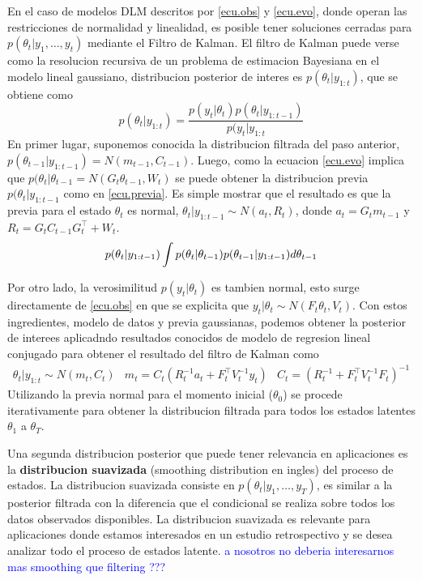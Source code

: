 \documentclass[12pt]{article}\usepackage[]{graphicx}\usepackage[]{color}
\begin{document}
En el caso de modelos DLM descritos por \eqref{ecu.obs} y \eqref{ecu.evo}, donde operan las restricciones de normalidad y linealidad, es posible tener soluciones cerradas para $p(\theta_t | y_1, \ldots, y_t)$ mediante el Filtro de Kalman. El filtro de Kalman puede verse como la resolucion recursiva de un problema de estimacion Bayesiana en el modelo lineal gaussiano, distribucion posterior de interes es $p(\theta_t | y_{1:t} )$, que se obtiene como
\[
p(\theta_t | y_{1:t}) = \frac{ p(y_t | \theta_t) p(\theta_{t} | y_{1:t-1})}{ p(y_t | y_{1:t}  }
\]
En primer lugar, suponemos conocida la distribucion filtrada del paso anterior, $p(\theta_{t-1} | y_{1:t-1}) = N(m_{t-1}, C_{t-1})$. Luego, como la ecuacion \eqref{ecu.evo} implica que $ p(\theta_{t} | \theta_{t-1} = N(G_t\theta_{t-1}, W_t)$ se puede obtener la distribucion previa $p(\theta_{t} | y_{1:t-1}$ como en \eqref{ecu.previa}. Es simple mostrar que el resultado es que la previa para el estado $\theta_t$ es normal, $\theta_t |y_{1:t-1} \sim N(a_t, R_t)$, donde $a_t = G_tm_{t-1}$ y $R_t = G_t C_{t-1} G_t^{\top} + W_t$. 
\begin{equation}
p(\theta_{t} | y_{1:t-1})  \int  p(\theta_{t} | \theta_{t-1}) p( \theta_{t-1}|y_{1:t-1}) d\theta_{t-1} \\
\label{ecu.previa}
\end{equation}

Por otro lado, la verosimilitud $p(y_t | \theta_t)$ es tambien normal, esto surge directamente de \eqref{ecu.obs} en que se explicita que $y_t | \theta_t \sim N(F_t \theta_t, V_t)$. Con estos ingredientes, modelo de datos y previa gaussianas, podemos obtener la posterior de interees aplicadndo resultados conocidos de modelo de regresion lineal conjugado para obtener el resultado del filtro de Kalman como 
\[\begin{array}{ccc}
\theta_t | y_{1:t} \sim N(m_t, C_t) & m_t = C_t( R_t^{-1}a_t + F_t^{\top}V_t^{-1}y_t ) & C_t = (R_t^{-1} + F_t^{\top}V_t^{-1}F_t)^{-1}
\end{array}
\]
Utilizando la previa normal para el momento inicial ($\theta_0$) se procede iterativamente para obtener la distribucion filtrada para todos los estados latentes $\theta_1$ a $\theta_T$. 

Una segunda distribucion posterior que puede tener relevancia en aplicaciones es la \textbf{distribucion suavizada} (smoothing distribution en ingles) del proceso de estados. La distribucion suavizada consiste en $p(\theta_t | y_1, \ldots, y_T)$, es similar a la posterior filtrada con la diferencia que el condicional se realiza sobre todos los datos observados disponibles. La distribucion suavizada es relevante para aplicaciones donde estamos interesados en un estudio retrospectivo y se desea analizar todo el proceso de estados latente. \textcolor{blue}{a nosotros no deberia interesarnos mas smoothing que filtering ???}
\end{document}
